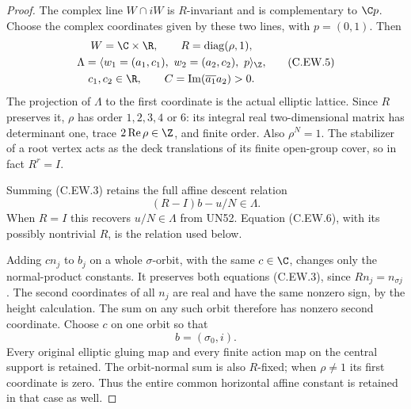 \begin{proof}
The complex line $W\cap iW$ is $R$-invariant and is
complementary to $\C p$. Choose the complex coordinates
given by these two lines, with $p=(0,1)$. Then
\[
 \begin{gathered}
 W=\C\times\R,\qquad R=\operatorname{diag}(\rho,1),\\
 \Lambda=\langle w_1=(a_1,c_1),\ w_2=(a_2,c_2),\ p\rangle_{\Z},\\
 c_1,c_2\in\R,\qquad
 C=\operatorname{Im}(\overline{a_1}a_2)>0.
 \end{gathered}
\tag{C.EW.5}
\]
The projection of $\Lambda$ to the first coordinate is
the actual elliptic lattice. Since $R$ preserves it,
$\rho$ has order $1,2,3,4$ or $6$: its integral real
two-dimensional matrix has determinant one, trace
$2\operatorname{Re}\rho\in\Z$, and finite order.
Also $\rho^N=1$. The stabilizer of a root vertex acts
as the deck translations of its finite open-group cover,
so in fact $R^r=I$.

Summing (C.EW.3) retains the full affine descent relation
\[
                         (R-I)b-u/N\in\Lambda.
\tag{C.EW.6}
\]
When $R=I$ this recovers $u/N\in\Lambda$ from UN52.
Equation (C.EW.6), with its possibly nontrivial $R$, is
the relation used below.

Adding $c n_j$ to $b_j$ on a whole $\sigma$-orbit,
with the same $c\in\C$, changes only the normal-product
constants. It preserves both equations (C.EW.3), since
$Rn_j=n_{\sigma j}$. The second coordinates of all
$n_j$ are real and have the same nonzero sign, by the
height calculation. The sum on any such orbit therefore
has nonzero second coordinate. Choose $c$ on one orbit
so that
\[
                              b=(\sigma_0,i).
\tag{C.EW.7}
\]
Every original elliptic gluing map and every finite
action map on the central support is retained.
The orbit-normal sum is also $R$-fixed; when
$\rho\ne1$ its first coordinate is zero. Thus the
entire common horizontal affine constant is retained
in that case as well.


\end{proof}
